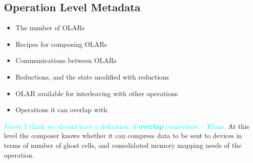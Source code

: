 \documentclass{article}
\newcommand{\JaredRfromKW}[1]   {\textcolor{cyan}{Jared: #1 - Klaus.}}
\newcommand{\shortOLAR}  {OLAR\xspace}
\newcommand{\shortOLARs} {OLARs\xspace}
\newcommand{\OLAR}   {\shortOLAR}             %
\newcommand{\OLARs}  {\shortOLARs}             %
\newcommand{\taskroutine}        {task routine\xspace}
\newcommand{\taskroutines}       {task routines\xspace}
\begin{document}

\subsection{Operation Level Metadata}
\begin{itemize}
\item The number of \OLARs
\item Recipes for composing \OLARs
\item Communications between \OLARs
\item Reductions, and the state modified with reductions
\item \OLAR available for interleaving with other operations
\item Operations it can overlap with
\end{itemize}
\JaredRfromKW{I think we should have a definition of \textbf{overlap} somewhere.}
At this level the composer knows whether it can compress data to be
sent to devices in terms of number of ghost cells, and consolidated
memory mapping needs of the operation.
\end{document}
